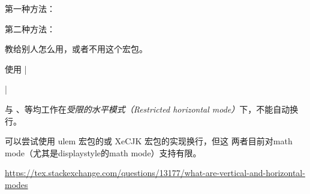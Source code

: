 第一种方法：
\begin{texlist}
  \newcommand{\mycmd}[2][\DefaultOpt]{%
    \def\DefaultOpt{#2}%
    optional arg: #1,  mandatory arg: #2%
  }
\end{texlist}

第二种方法：
\begin{texlist}
  \def\mycmd{\futurelet\testchar\WithOptCmd}
  \def\WithOptCmd{%
    \ifx[\testchar 
      \let\next\OptCmd 
    \else 
      \let\next\NoOptCmd 
    \fi\next}
  \def\OptCmd[#1]#2{optional arg: #1,  mandatory arg: #2}
  \def\NoOptCmd#1{optional arg: #1,  mandatory arg: #1}
\end{texlist}



教给别人怎么用，或者不用这个宏包。





使用 |\usepackage{indentfirst}|



















与 、等均工作在\textit{受限的水平模式（Restricted
  horizontal mode）}下，不能自动换行。

可以尝试使用 ulem 宏包的或 XeCJK 宏包的实现换行，但这
两者目前对math mode（尤其是displaystyle的math mode）支持有限。

\begin{reference}
\item \url{https://tex.stackexchange.com/questions/13177/what-are-vertical-and-horizontal-modes}
\end{reference}

